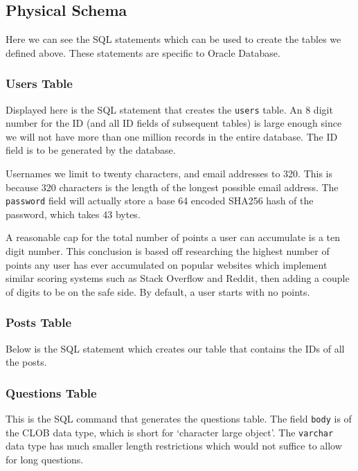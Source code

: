 \subsection{Physical Schema}

Here we can see the SQL statements which can be used to create the tables we defined above. These statements are specific to Oracle Database.

\subsubsection{Users Table}

Displayed here is the SQL statement that creates the \verb`users` table. An 8 digit number for the ID (and all ID fields of subsequent tables) is large enough since we will not have more than one million records in the entire database. The ID field is to be generated by the database.

Usernames we limit to twenty characters, and email addresses to 320. This is because 320 characters is the length of the longest possible email address. The \verb`password` field will actually store a base 64 encoded SHA256 hash of the password, which takes 43 bytes.

A reasonable cap for the total number of points a user can accumulate is a ten digit number. This conclusion is based off researching the highest number of points any user has ever accumulated on popular websites which implement similar scoring systems such as Stack Overflow and Reddit, then adding a couple of digits to be on the safe side. By default, a user starts with no points.


\subsubsection{Posts Table}

Below is the SQL statement which creates our table that contains the IDs of all the posts.


\subsubsection{Questions Table}

This is the SQL command that generates the questions table. The field \verb`body` is of the CLOB data type, which is short for `character large object'. The \verb`varchar` data type has much smaller length restrictions which would not suffice to allow for long questions.

